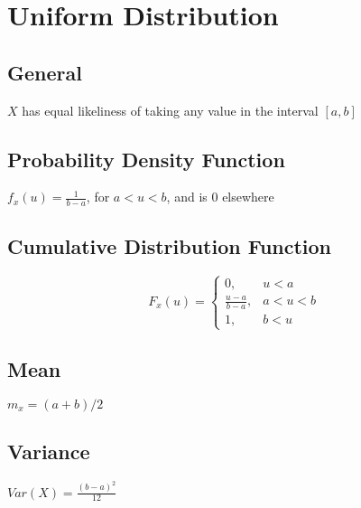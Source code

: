 \section*{Uniform Distribution}

\subsection*{General}
$X$ has equal likeliness of taking any value in the interval $[a,b]$

\subsection*{Probability Density Function}
$f_x(u) = \frac{1}{b-a}$, for $a<u<b$, and is 0 elsewhere

\subsection*{Cumulative Distribution Function}
\[ F_x(u)=
  \begin{cases} 
      0,               &     u < a \\
      \frac{u-a}{b-a}, & a < u < b \\
      1,               & b < u 
   \end{cases}
\]

\subsection*{Mean}
$m_x=(a+b)/2 $ 

\subsection*{Variance}
$Var(X)=\frac{(b-a)^2}{12}$
    

